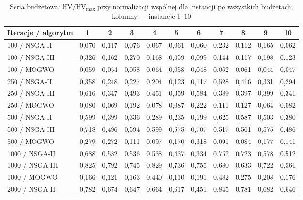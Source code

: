 \begin{table}[htbp]
    \centering
    \caption{Seria budżetowa: $\mathrm{HV}/\mathrm{HV}_{\max}$ przy normalizacji wspólnej dla instancji po wszystkich budżetach; kolumny --- instancje 1--10}
    \label{tab:per_run_budget}
    \begin{tabular}{l c c c c c c c c c c }
        \hline
        Iteracje / algorytm & 1 & 2 & 3 & 4 & 5 & 6 & 7 & 8 & 9 & 10 \\
        \hline
        100 / NSGA-II & 0{,}070 & 0{,}117 & 0{,}076 & 0{,}067 & 0{,}061 & 0{,}060 & 0{,}232 & 0{,}112 & 0{,}165 & 0{,}062 \\
        100 / NSGA-III & 0{,}326 & 0{,}162 & 0{,}270 & 0{,}168 & 0{,}059 & 0{,}099 & 0{,}144 & 0{,}117 & 0{,}198 & 0{,}123 \\
        100 / MOGWO & 0{,}059 & 0{,}054 & 0{,}058 & 0{,}064 & 0{,}058 & 0{,}048 & 0{,}062 & 0{,}061 & 0{,}044 & 0{,}047 \\
        250 / NSGA-II & 0{,}358 & 0{,}248 & 0{,}227 & 0{,}204 & 0{,}123 & 0{,}117 & 0{,}528 & 0{,}416 & 0{,}331 & 0{,}294 \\
        250 / NSGA-III & 0{,}616 & 0{,}347 & 0{,}493 & 0{,}451 & 0{,}359 & 0{,}584 & 0{,}389 & 0{,}397 & 0{,}399 & 0{,}341 \\
        250 / MOGWO & 0{,}080 & 0{,}069 & 0{,}192 & 0{,}078 & 0{,}087 & 0{,}222 & 0{,}111 & 0{,}127 & 0{,}064 & 0{,}082 \\
        500 / NSGA-II & 0{,}599 & 0{,}399 & 0{,}336 & 0{,}289 & 0{,}235 & 0{,}199 & 0{,}625 & 0{,}587 & 0{,}503 & 0{,}380 \\
        500 / NSGA-III & 0{,}718 & 0{,}496 & 0{,}594 & 0{,}599 & 0{,}575 & 0{,}707 & 0{,}517 & 0{,}561 & 0{,}575 & 0{,}486 \\
        500 / MOGWO & 0{,}279 & 0{,}272 & 0{,}111 & 0{,}097 & 0{,}170 & 0{,}318 & 0{,}091 & 0{,}084 & 0{,}177 & 0{,}141 \\
        1000 / NSGA-II & 0{,}688 & 0{,}532 & 0{,}536 & 0{,}538 & 0{,}437 & 0{,}334 & 0{,}752 & 0{,}723 & 0{,}578 & 0{,}512 \\
        1000 / NSGA-III & 0{,}825 & 0{,}792 & 0{,}745 & 0{,}829 & 0{,}736 & 0{,}755 & 0{,}680 & 0{,}633 & 0{,}722 & 0{,}561 \\
        1000 / MOGWO & 0{,}166 & 0{,}121 & 0{,}163 & 0{,}440 & 0{,}110 & 0{,}191 & 0{,}482 & 0{,}275 & 0{,}208 & 0{,}176 \\
        2000 / NSGA-II & 0{,}782 & 0{,}674 & 0{,}647 & 0{,}664 & 0{,}617 & 0{,}451 & 0{,}845 & 0{,}781 & 0{,}682 & 0{,}646 \\

\end{tabular}
\end{table}
